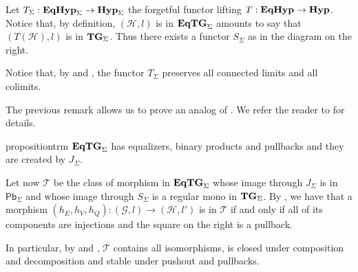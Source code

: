 \documentclass[a4paper,UKenglish,cleveref,pdftex,thm-restate,numberwithinsect]{lipics-v2021}
\newcommand{\pbc}{\mathsf{Pb}}
\newcommand{\catname}[1]{\textbf{\textup{#1}}}
\newcommand{\hyp}{\catname{Hyp}}
\newcommand{\EqHyp}{\catname{EqHyp}} %
\newcommand{\EqTG}{\catname{EqTG}}
\newcommand{\tg}[0]{\catname{TG}_{\Sigma}}
\begin{document}
\noindent 
\parbox{9.5cm}{\begin{remark}\label{rem:obv}
Let $T_\Sigma:  \EqHyp_{\Sigma} \to \hyp_{\Sigma}$ the forgetful functor lifting
$T:  \EqHyp \to \hyp$.
%
Notice that, by definition, $(\mathcal{H}, l)$ is in $\EqTG_{\Sigma}$ amounts to say that $(T(\mathcal{H}), l)$ is in $\tg$. 
Thus there exists a functor $S_\Sigma$ as in the diagram on the right.
\end{remark}}
\hfill 
\parbox{4cm}{\xymatrix@R=15pt{\EqTG_{\Sigma} \ar[r]_{J_\Sigma}  \ar[d]_{S_\Sigma}& \EqHyp_\Sigma \ar[d]^{T_\Sigma} \\ \tg \ar[r]^{I_\Sigma}& \hyp_{\Sigma}}}

\begin{remark}\label{rem:t}
	Notice that, by  and , the functor $T_\Sigma$ preserves all connected limits and all colimits.
\end{remark}

 The previous remark allows us to prove an analog of . We refer the reader to  for details.
 
 \begin{restatable}{proposition}{trm}\label{prop:term}
$\EqTG_{\Sigma}$ has equalizers, binary products and pullbacks and they are created by $J_\Sigma$.
 \end{restatable}
 
\noindent
\parbox{11cm}{\hspace{15pt}Let now $\mathcal{T}$ be the class of morphism in $\EqTG_{\Sigma}$ whose image through $J_\Sigma$ is in $\pbc_\Sigma$ and whose image through $S_\Sigma$ is a regular mono in $\tg$.  By , we have that a morphism $(h_E, h_V, h_Q)\colon (\mathcal{G},l)\to (\mathcal{H}, l')$ is in $\mathcal{T}$ if and only if all of its components are injections and the square on the right is a pullback.} \hfill 
\parbox{2cm}{ }

\smallskip 
In particular, by  and , $\mathcal{T}$ contains all isomorphisms, is closed under composition and decomposition and stable under pushout and pullbacks.
\end{document}

